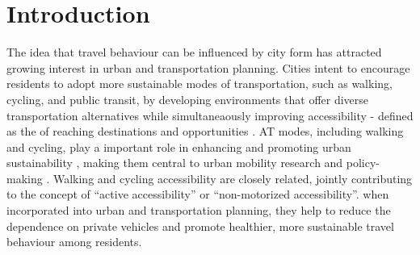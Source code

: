 \documentclass[preprint, 3p,
authoryear]{elsarticle} %
\begin{document}
\section{Introduction}\label{introduction}

The idea that travel behaviour can be influenced by city form has
attracted growing interest in urban and transportation planning. Cities
intent to encourage residents to adopt more sustainable modes of
transportation, such as walking, cycling, and public transit, by
developing environments that offer diverse transportation alternatives
while simultaneaously improving accessibility - defined as the of
reaching destinations and opportunities \citep{iacono2008access}. AT
modes, including walking and cycling, play a important role in enhancing
and promoting urban sustainability
\citep{hino2014built, lamiquiz2015effects}, making them central to urban
mobility research and policy-making
\citep{handy1993regional, clifton2001evaluating, frank2001built, krizek2005perspectives, sallis2004active, vandenbulcke2009mapping, wu2019measuring}.
Walking and cycling accessibility are closely related, jointly
contributing to the concept of ``active accessibility'' or
``non-motorized accessibility''. when incorporated into urban and
transportation planning, they help to reduce the dependence on private
vehicles and promote healthier, more sustainable travel behaviour among
residents.
\end{document}
